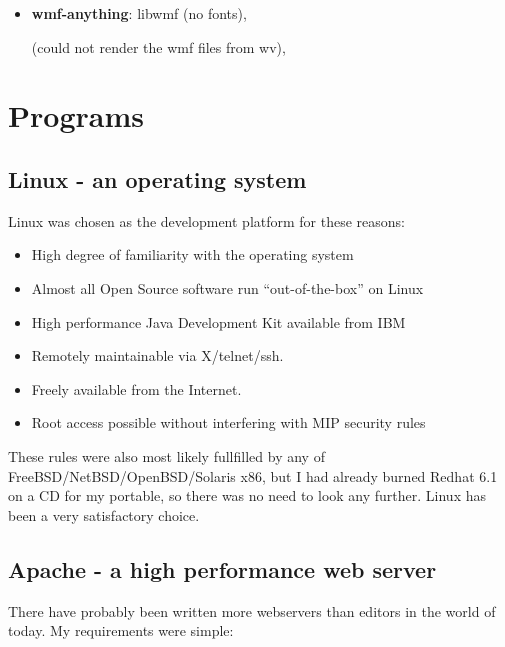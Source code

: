 \begin{itemize}
\item \textbf{ wmf-anything}: libwmf (no fonts),
  
   (could
  not render the wmf files from wv),
  

  
\end{itemize}


\section{Programs}


\subsection{Linux - an operating system}
\label{sec:linux}

Linux was chosen as the development platform for these reasons:

\begin{itemize}
\item High degree of familiarity with the operating system
\item Almost all Open Source software run ``out-of-the-box'' on Linux
\item High performance Java Development Kit available from IBM
\item Remotely maintainable via X/telnet/ssh.
\item Freely available from the Internet.
\item Root access possible without interfering with MIP security rules
\end{itemize}

These rules were also most likely fullfilled by any of
FreeBSD/NetBSD/OpenBSD/Solaris x86, but I had already burned Redhat
6.1 on a CD for my portable, so there was no need to look any
further.  Linux has been a very satisfactory choice.

\subsection{Apache - a high performance web server}
\label{sec:apache}

There have probably been written more webservers than editors in the
world of today.  My requirements were simple:

